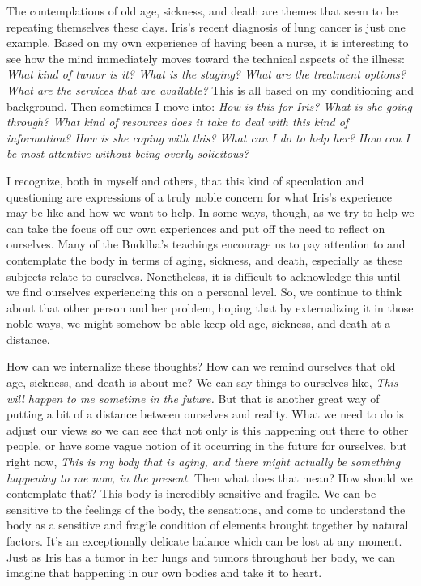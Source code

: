
The contemplations of old age, sickness, and death are themes that seem 
to be repeating themselves these days. Iris's recent diagnosis of lung 
cancer is just one example. Based on my own experience of having been a 
nurse, it is interesting to see how the mind immediately moves toward 
the technical aspects of the illness: \emph{What kind of tumor is it? 
What is the staging? What are the treatment options? What are the 
services that are available?} This is all based on my conditioning and 
background. Then sometimes I move into: \emph{How is this for Iris? 
What is she going through? What kind of resources does it take to deal 
with this kind of information? How is she coping with this? What can I 
do to help her? How can I be most attentive without being overly 
solicitous?}

I recognize, both in myself and others, that this kind of speculation 
and questioning are expressions of a truly noble concern for what 
Iris's experience may be like and how we want to help. In some ways, 
though, as we try to help we can take the focus off our own experiences 
and put off the need to reflect on ourselves. Many of the Buddha's 
teachings encourage us to pay attention to and contemplate the body in 
terms of aging, sickness, and death, especially as these subjects 
relate to ourselves. Nonetheless, it is difficult to acknowledge this 
until we find ourselves experiencing this on a personal level. So, we 
continue to think about that other person and her problem, hoping that 
by externalizing it in those noble ways, we might somehow be able keep 
old age, sickness, and death at a distance.

How can we internalize these thoughts? How can we remind ourselves that 
old age, sickness, and death is about me? We can say things to 
ourselves like, \emph{This will happen to me sometime in the future.} 
But that is another great way of putting a bit of a distance between 
ourselves and reality. What we need to do is adjust our views so we can 
see that not only is this happening out there to other people, or have 
some vague notion of it occurring in the future for ourselves, but 
right now, \emph{This is my body that is aging, and there might 
actually be something happening to me now, in the present.} Then what 
does that mean? How should we contemplate that? This body is incredibly 
sensitive and fragile. We can be sensitive to the feelings of the body, 
the sensations, and come to understand the body as a sensitive and 
fragile condition of elements brought together by natural factors. It's 
an exceptionally delicate balance which can be lost at any moment. Just 
as Iris has a tumor in her lungs and tumors throughout her body, we can 
imagine that happening in our own bodies and take it to heart.

